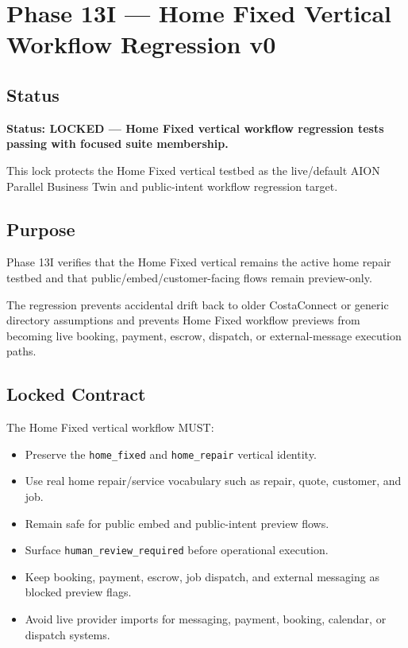 \section{Phase 13I --- Home Fixed Vertical Workflow Regression v0}
\label{sec:aion-phase13i-home-fixed-vertical-workflow-regression-lock}

\subsection{Status}

\textbf{Status: LOCKED --- Home Fixed vertical workflow regression tests passing with focused suite membership.}

This lock protects the Home Fixed vertical testbed as the live/default
AION Parallel Business Twin and public-intent workflow regression target.

\subsection{Purpose}

Phase 13I verifies that the Home Fixed vertical remains the active home repair
testbed and that public/embed/customer-facing flows remain preview-only.

The regression prevents accidental drift back to older CostaConnect or generic
directory assumptions and prevents Home Fixed workflow previews from becoming
live booking, payment, escrow, dispatch, or external-message execution paths.

\subsection{Locked Contract}

The Home Fixed vertical workflow MUST:

\begin{itemize}
  \item Preserve the \texttt{home\_fixed} and \texttt{home\_repair} vertical identity.
  \item Use real home repair/service vocabulary such as repair, quote, customer, and job.
  \item Remain safe for public embed and public-intent preview flows.
  \item Surface \texttt{human\_review\_required} before operational execution.
  \item Keep booking, payment, escrow, job dispatch, and external messaging as blocked preview flags.
  \item Avoid live provider imports for messaging, payment, booking, calendar, or dispatch systems.
\end{itemize}

